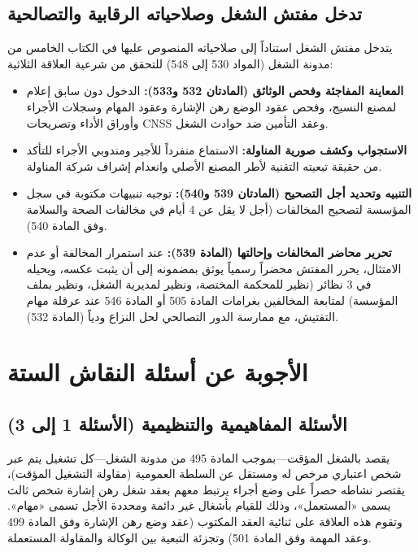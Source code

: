 \subsection{تدخل مفتش الشغل وصلاحياته الرقابية والتصالحية}
يتدخل مفتش الشغل استناداً إلى صلاحياته المنصوص عليها في الكتاب الخامس من مدونة الشغل (المواد \textenglish{530} إلى \textenglish{548}) للتحقق من شرعية العلاقة الثلاثية:
\begin{itemize}[leftmargin=*, itemsep=5pt]
    \item \textbf{المعاينة المفاجئة وفحص الوثائق (المادتان \textenglish{532} و\textenglish{533}):} الدخول دون سابق إعلام لمصنع النسيج، وفحص عقود الوضع رهن الإشارة وعقود المهام وسجلات الأجراء وأوراق الأداء وتصريحات \textenglish{CNSS} وعقد التأمين ضد حوادث الشغل.
    \item \textbf{الاستجواب وكشف صورية المناولة:} الاستماع منفرداً للأجير ومندوبي الأجراء للتأكد من حقيقة تبعيته التقنية لأطر المصنع الأصلي وانعدام إشراف شركة المناولة.
    \item \textbf{التنبيه وتحديد أجل التصحيح (المادتان \textenglish{539} و\textenglish{540}):} توجيه تنبيهات مكتوبة في سجل المؤسسة لتصحيح المخالفات (أجل لا يقل عن \textenglish{4} أيام في مخالفات الصحة والسلامة وفق المادة \textenglish{540}).
    \item \textbf{تحرير محاضر المخالفات وإحالتها (المادة \textenglish{539}):} عند استمرار المخالفة أو عدم الامتثال، يحرر المفتش محضراً رسمياً يوثق بمضمونه إلى أن يثبت عكسه، ويحيله في \textenglish{3} نظائر (نظير للمحكمة المختصة، ونظير لمديرية الشغل، ونظير بملف المؤسسة) لمتابعة المخالفين بغرامات المادة \textenglish{505} أو المادة \textenglish{546} عند عرقلة مهام التفتيش، مع ممارسة الدور التصالحي لحل النزاع ودياً (المادة \textenglish{532}).
\end{itemize}

\section{الأجوبة عن أسئلة النقاش الستة}

\subsection{الأسئلة المفاهيمية والتنظيمية (الأسئلة 1 إلى 3)}

\vspace{0.2cm}\par\smallskip
يقصد بالشغل المؤقت—بموجب المادة \textenglish{495} من مدونة الشغل—كل تشغيل يتم عبر شخص اعتباري مرخص له ومستقل عن السلطة العمومية (مقاولة التشغيل المؤقت)، يقتصر نشاطه حصراً على وضع أجراء يرتبط معهم بعقد شغل رهن إشارة شخص ثالث يسمى «المستعمل»، وذلك للقيام بأشغال غير دائمة ومحددة الأجل تسمى «مهام». وتقوم هذه العلاقة على ثنائية العقد المكتوب (عقد وضع رهن الإشارة وفق المادة \textenglish{499} وعقد المهمة وفق المادة \textenglish{501}) وتجزئة التبعية بين الوكالة والمقاولة المستعملة.

